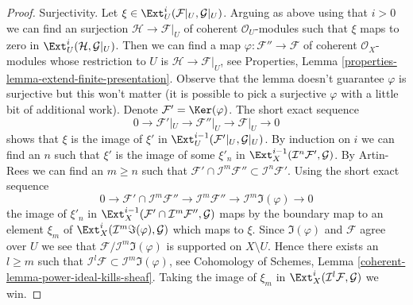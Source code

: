 \begin{proof}
\medskip\noindent
Surjectivity. Let $\xi \in \Ext^i_U(\mathcal{F}|_U, \mathcal{G}|_U)$.
Arguing as above using that $i > 0$ we can find an surjection
$\mathcal{H} \to \mathcal{F}|_U$ of coherent $\mathcal{O}_U$-modules
such that $\xi$ maps to zero in $\Ext^i_U(\mathcal{H}, \mathcal{G}|_U)$.
Then we can find a map $\varphi : \mathcal{F}'' \to \mathcal{F}$
of coherent $\mathcal{O}_X$-modules whose restriction to $U$ is
$\mathcal{H} \to \mathcal{F}|_U$, see
Properties, Lemma \ref{properties-lemma-extend-finite-presentation}.
Observe that the lemma doesn't guarantee $\varphi$ is surjective
but this won't matter (it is possible to pick a surjective $\varphi$
with a little bit of additional work).
Denote $\mathcal{F}' = \Ker(\varphi)$. The short exact sequence
$$
0 \to \mathcal{F}'|_U \to \mathcal{F}''|_U \to \mathcal{F}|_U \to 0
$$
shows that $\xi$ is the image of $\xi'$ in
$\Ext^{i - 1}_U(\mathcal{F}'|_U, \mathcal{G}|_U)$.
By induction on $i$ we can find an $n$ such that
$\xi'$ is the image of some $\xi'_n$ in
$\Ext^{i - 1}_X(\mathcal{I}^n\mathcal{F}', \mathcal{G})$.
By Artin-Rees we can find an $m \geq n$ such that
$\mathcal{F}' \cap \mathcal{I}^m\mathcal{F}'' \subset
\mathcal{I}^n\mathcal{F}'$. Using the short exact sequence
$$
0 \to \mathcal{F}' \cap \mathcal{I}^m\mathcal{F}'' \to
\mathcal{I}^m\mathcal{F}'' \to \mathcal{I}^m\Im(\varphi) \to 0
$$
the image of $\xi'_n$ in
$\Ext^{i - 1}_X(\mathcal{F}' \cap \mathcal{I}^m\mathcal{F}'', \mathcal{G})$
maps by the boundary map to an element $\xi_m$ of
$\Ext^i_X(\mathcal{I}^m\Im(\varphi), \mathcal{G})$ which maps
to $\xi$. Since $\Im(\varphi)$ and $\mathcal{F}$ agree over $U$
we see that $\mathcal{F}/\mathcal{I}^m\Im(\varphi)$ is supported
on $X \setminus U$. Hence there exists an $l \geq m$
such that $\mathcal{I}^l\mathcal{F} \subset \mathcal{I}^m\Im(\varphi)$, see
Cohomology of Schemes, Lemma \ref{coherent-lemma-power-ideal-kills-sheaf}.
Taking the image of $\xi_m$ in
$\Ext^i_X(\mathcal{I}^l\mathcal{F}, \mathcal{G})$ we win.
\end{proof}